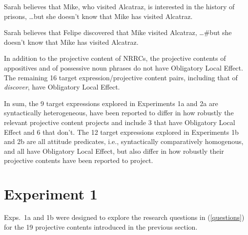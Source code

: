 \documentclass[11pt,fleqn]{article}
\newcommand{\6}{\mbox{$[\hspace*{-.6mm}[$}}
\newcommand{\9}{\mbox{$]\hspace*{-.6mm}]$}}
\begin{document}
\begin{exe}
\ex\label{ole}
\begin{xlist}
\ex Sarah believes that Mike, who visited Alcatraz, is interested in the history of prisons, \ldots but she doesn't know that Mike has visited Alcatraz.

\ex Sarah believes that Felipe discovered that Mike visited Alcatraz, \ldots \#but she doesn't know that Mike has visited Alcatraz. 

\end{xlist}
\end{exe}
In addition to the projective content of NRRCs, the projective contents of appositives and of possessive noun phrases do not have Obligatory Local Effect. The remaining 16 target expression/projective content pairs, including that of {\em discover}, have Obligatory Local Effect. 

In sum, the 9 target expressions explored in Experiments 1a and 2a are syntactically heterogeneous, have been reported to differ in how robustly the relevant projective content projects and include 3 that have Obligatory Local Effect and 6 that don't. The 12 target expressions explored in Experiments 1b and 2b are all attitude predicates, i.e., syntactically comparatively homogenous, and all have Obligatory Local Effect, but also differ in how robustly their projective contents have been reported to project.


\section{Experiment 1}
\label{s3}

Exps.~1a and 1b were designed to explore the research questions in (\ref{questions}) for the 19 projective contents introduced in the previous section.
\end{document}
